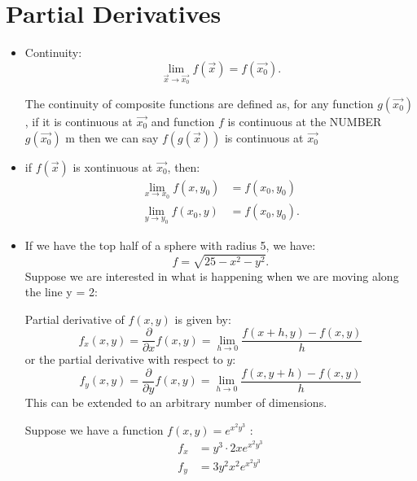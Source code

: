 \section{Partial Derivatives}
\begin{itemize}
	\item Continuity:
\[
			\lim_{\vec{x} \to \vec{x_0}} f\left( \vec{x} \right)  = f\left( \vec{x_0} \right) 
			.\] 
		\begin{theorem}
			The continuity of composite functions are defined as, for any function $g\left( \vec{x_0} \right) $, if it is continuous at $\vec{x_0}$ and function $f$ is continuous at the NUMBER $g\left( \vec{x_0} \right) $ m then we can say $f\left( g\left( \vec{x} \right)  \right) $ is continuous at $\vec{x_0}$
		\end{theorem}
	\item if $f\left( \vec{x} \right) $ is xontinuous at $\vec{x_0}$, then:
		\begin{align*}
			\lim_{x \to x_0} f\left( x, y_0 \right)  &=  f\left( x_0, y_0 \right)\\
			\lim_{y \to y_0}  f\left( x_0, y \right)  &= f\left( x_0, y_0 \right) 
		.\end{align*}
	\item If we have the top half of a sphere with radius 5, we have:
		\[
		f = \sqrt{25 - x^2 -y^2} 
		.\] 
		Suppose we are interested in what is happening when we are moving along the line y = 2:
		\begin{definition}
			Partial derivative of $f\left( x,y \right) $ is given by:
			\begin{equation}
				f_{x}\left( x, y \right)  = \frac{\partial}{\partial x} f\left( x,y \right)  = \lim_{h \to 0} \frac{f\left( x+h, y \right) -f\left( x,y \right) }{h}
			\end{equation}
			or the partial derivative with respect to $y$:
			\begin{equation}
				f_y\left( x,y \right)  = \frac{\partial }{\partial y} f\left( x, y \right)  = \lim_{h \to 0} \frac{f\left( x,y+h \right) -f\left( x,y \right) }{h}
			\end{equation}
			This can be extended to an arbitrary number of dimensions.
		\end{definition}
		\begin{example}
			Suppose we have a function $f\left( x,y \right)  = e^{x^2y^3}$ :
			\begin{align*}
				f_x &= y^3\cdot 2xe^{x^2y^3}\\
				f_y &= 3y^2x^2e^{x^2y^3} \\

\end{align*}
\end{example}
\end{itemize}
